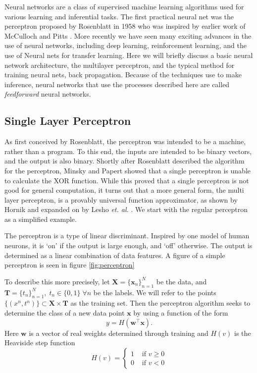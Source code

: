 Neural networks are a class of supervised machine learning algorithms used for various learning and inferential tasks.  The first practical neural net was the perceptron proposed by Rosenblatt in 1958 \cite{Rosenblatt58theperceptron} who was inspired by earlier work of McCulloch and Pitts \cite{McCulloch-Pitts}.  More recently we have seen many exciting advances in the use of neural networks, including deep learning, reinforcement learning, and the use of Neural nets for transfer learning.
Here we will briefly discuss a basic neural network architecture, the multilayer perceptron, and the typical method for training neural nets, back propagation.  Because of the techniques use to make inference, neural networks that use the processes described here are called \textit{feedforward} neural networks.
\subsection{Single Layer Perceptron}
As first conceived by Rosenblatt, the perceptron was intended to be a machine, rather than a program. To this end, the inputs are intended to be binary vectors, and the output is also binary.  Shortly after Rosenblatt described the algorithm for the perceptron, Minsky and Papert \cite{Minsky90Perceptron} showed that a single perceptron is unable to calculate the XOR function.  While this proved that a single perceptron is not good for general computation, it turns out that a more general form, the multi layer perceptron, is a provably universal function approximator, as shown by Hornik \cite{HORNIK1991251} and expanded on by Lesho \textit{et. al.} \cite{LESHNO1993861}.  We start with the regular perceptron as a simplified example.

The perceptron is a type of linear discriminant.  Inspired by one model of human neurons, it is `on' if the output is large enough, and `off' otherwise.  The output is determined as a linear combination of data features.  A figure of a simple perceptron is seen in figure \ref{fig:perceptron}



To describe this more precisely, let $\bm{X}=\{\bm x_n\}_{n=1}^{N}$ be the data, and \( \bm{T} =\{t_n\}_{n=1}^{N},\; t_n\in \{0,1\} \;\forall n \) be the labels. We will refer to the points \( \{(x^n,t^n)\}\subset\bm{X}\times \bm{T} \) as the training set. Then the perceptron algorithm seeks to determine the class of a new data point \( \bm x \) by using a function of the form
\begin{equation}\label{perceptron}
y = H(\bm w^{\intercal} \bm x).
\end{equation}
Here \( \bm w \) is a vector of real weights determined through training and  \( H(v) \) is the Heaviside step function
\[ H(v) =\begin{cases}
 			1 &\text{ if }v\geq 0\\
 			0 &\text{ if }v<0
		 \end{cases} 
\]

